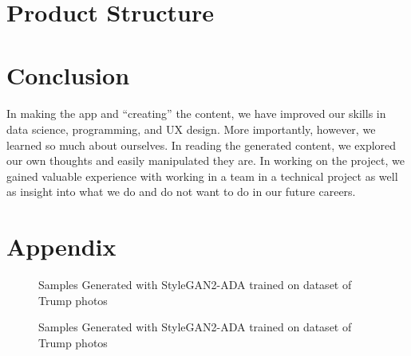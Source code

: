 \documentclass[12pt, letterpaper]{article}
\begin{document}
\section{Product Structure}

\section{Conclusion}

\paragraph{}In making the app and “creating” the content, we have improved our skills in data science, programming, and UX design. More importantly, however, we learned so much about ourselves. In reading the generated content, we explored our own thoughts and easily manipulated they are. In working on the project, we gained valuable experience with working in a team in a technical project as well as insight into what we do and do not want to do in our future careers.

\section*{Appendix}

\begin{figure}[h]
	\begin{center}
    	\qquad
    	\qquad
    	\qquad
	\end{center}
      
    \caption{Samples Generated with StyleGAN2-ADA trained on dataset of Trump photos}
    \label{trump}
    
\end{figure}

\begin{figure}[h]
	\begin{center}
    	\qquad
    	\qquad
    	\qquad
    	\qquad
	\end{center}
      
    \caption{Samples Generated with StyleGAN2-ADA trained on dataset of Trump photos}
    \label{trump}
    
\end{figure}
\end{document}
